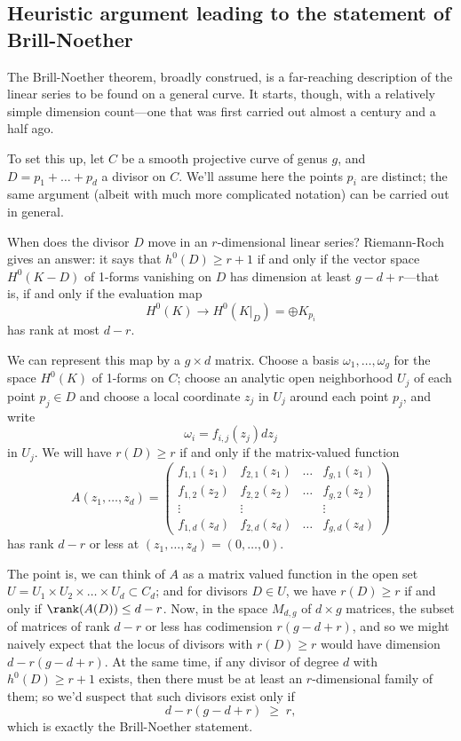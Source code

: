 \subsection{Heuristic argument leading to the statement of Brill-Noether}

The Brill-Noether theorem, broadly construed, is a far-reaching description of the linear series to be found on a general curve. It starts, though, with a relatively simple dimension count---one that was first carried out almost a century and a half ago.

To set this up, let $C$ be a smooth projective curve of genus $g$, and $D = p_1 + \dots + p_d$ a divisor on $C$. We'll assume here the points $p_i$ are distinct; the same argument (albeit with much more complicated notation) can be carried out in general.

When does the divisor $D$ move in an $r$-dimensional linear series? Riemann-Roch gives an answer: it says that $h^0(D) \geq r+1$ if and only if the vector space $H^0(K-D)$ of 1-forms vanishing on $D$ has dimension at least $g-d+r$---that is, if and only if the  evaluation map
$$
H^0(K) \to H^0(K|_D) = \oplus K_{p_i}
$$
has rank at most $d-r$. 

We can represent this map by a $g \times d$ matrix. Choose a basis $\omega_1,\dots,\omega_g$ for the space $H^0(K)$ of 1-forms on $C$; choose an analytic open neighborhood $U_j$ of each point $p_j \in D$ and choose a local coordinate $z_j$ in $U_j$ around each point $p_j$, and write
$$
\omega_i = f_{i,j}(z_j)dz_j
$$
in $U_j$. We will have $r(D) \geq r$ if and only if the  matrix-valued function
$$
A(z_1,\dots,z_d) = 
\begin{pmatrix}
f_{1,1}(z_1) & f_{2,1}(z_1) & \dots & f_{g,1}(z_1) \\
f_{1,2}(z_2) & f_{2,2}(z_2) & \dots & f_{g,2}(z_2) \\
\vdots & \vdots &  & \vdots \\
f_{1,d}(z_d) & f_{2,d}(z_d) & \dots & f_{g,d} (z_d)
\end{pmatrix}
$$
has rank $d-r$ or less at $(z_1,\dots,z_d) = (0,\dots,0)$.

The point is, we can think of $A$ as a matrix valued function in the open set $U = U_1 \times U_2 \times \dots \times U_d \subset C_d$; and for divisors $D \in U$, we have $r(D) \geq r$ if and only if $\rank(A(D)) \leq d-r$. Now, in the space $M_{d,g}$ of $d \times g$ matrices, the subset of matrices of rank $d-r$ or less has codimension $r(g-d+r)$, and so we might naively expect that the locus of divisors with $r(D) \geq r$ would have dimension $d - r(g-d+r)$. At the same time, if any divisor of degree $d$ with $h^0(D) \geq r+1$ exists, then there must be at least an $r$-dimensional family of them; so we'd suspect that such divisors exist only if
$$
d - r(g-d+r) \; \geq \; r,
$$
which is exactly the Brill-Noether statement.

